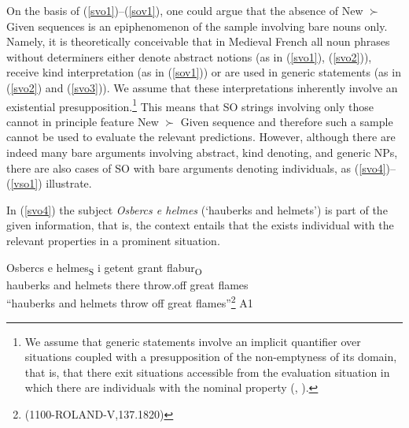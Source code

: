 \documentclass[output=paper,modfonts,nonflat]{langsci/langscibook}
\begin{document}
On the basis of (\ref{svo1})--(\ref{sov1}), one could argue that the absence of New $\succ$ Given sequences is an epiphenomenon of the sample involving bare nouns only. Namely, it is theoretically conceivable that in Medieval French all noun phrases without determiners either denote abstract notions (as in (\ref{svo1}), (\ref{svo2})), receive kind interpretation (as in (\ref{sov1})) or are used in generic statements (as in (\ref{svo2}) and (\ref{svo3})). We assume that these interpretations inherently involve an existential presupposition.\footnote{We assume that generic statements involve an implicit quantifier over situations coupled with a presupposition of the non-emptyness of its domain, that is, that there exit situations accessible from the evaluation situation in which there are individuals with the nominal property (\citet{Lee:1995}, \citet{vonFintel:1996}).} This means that SO strings involving only those cannot in principle feature New $\succ$ Given sequence and therefore such a sample cannot be used to evaluate the relevant predictions. However, although there are indeed many bare arguments involving abstract, kind denoting, and generic NPs, there are also cases of SO with bare arguments denoting individuals, as (\ref{svo4})--(\ref{vso1}) illustrate. %

In (\ref{svo4}) the subject {\itshape Osbercs e helmes} (`hauberks and helmets') is part of the given information, that is, the context entails that the exists individual with the relevant properties in a prominent situation.

\ea
\gll Osbercs e helmes\textsubscript{S} i getent grant flabur\textsubscript{O}\\
hauberks and helmets there throw.off great flames\\
\glt ``hauberks and helmets throw off great flames''\footnote{{(1100-ROLAND-V,137.1820)}}\label{svo4} \hfill A1
\z


\end{document}
